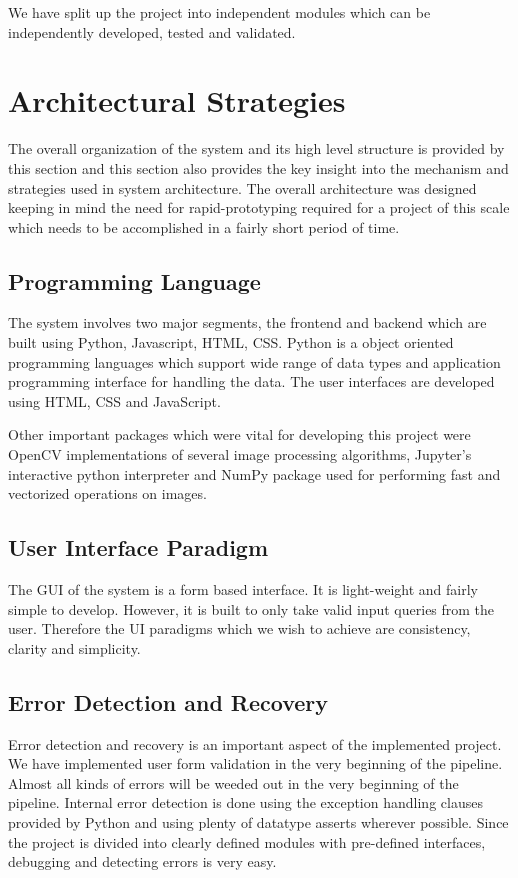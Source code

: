     We have split up the project into independent modules which can be independently developed, tested and validated.


\section{Architectural Strategies}
The overall organization of the system and its high level structure is provided by this section and this section also provides the key insight into the mechanism and strategies used in system architecture. The overall architecture was designed keeping in mind the need for rapid-prototyping required for a project of this scale which needs to be accomplished in a fairly short period of time.

    \subsection{Programming Language}
    The system involves two major segments, the frontend and backend which are built using Python, Javascript, HTML, CSS. Python is a object oriented programming languages which support wide range of data types and application programming interface for handling the data. The user interfaces are developed using HTML, CSS and JavaScript.

    Other important packages which were vital for developing this project were OpenCV implementations of several image processing algorithms, Jupyter’s interactive python interpreter and NumPy package used for performing fast and vectorized operations on images.

    \subsection{User Interface Paradigm}
    The GUI of the system is a form based interface. It is light-weight and fairly simple to develop. However, it is built to only take valid input queries from the user. Therefore the UI paradigms which we wish to achieve are consistency, clarity and simplicity.

    \subsection{Error Detection and Recovery}
    Error detection and recovery is an important aspect of the implemented project. We have implemented user form validation in the very beginning of the pipeline. Almost all kinds of errors will be weeded out in the very beginning of the pipeline. Internal error detection is done using the exception handling clauses provided by Python and using plenty of datatype asserts wherever possible. Since the project is divided into clearly defined modules with pre-defined interfaces, debugging and detecting errors is very easy.

